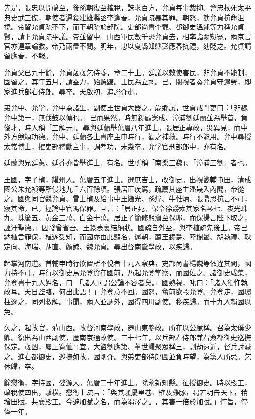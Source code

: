 \begin{pinyinscope}
先是，張忠以開礦至，後孫朝復至榷稅，誅求百方，允貞每事裁抑。會忠杖死太平典史武三傑，朝使者逼殺建雄縣丞李逢春，允貞疏暴其罪。朝怒，劾允貞抗命沮撓。帝留允貞疏不下，而下朝疏於部院。吏部尚書李戴、都御史溫純等力稱允貞賢，請下允貞疏平議。帝並留中。山西軍民數千恐允貞去，相率詣闕愬冤，兩京言官亦連章論救。帝乃兩置不問。明年，忠以夏縣知縣彭應春抗禮，劾貶之。允貞請留應春，不報。

允貞父已九十餘，允貞歲歲乞侍養，章二十上。廷議以敕使害民，非允貞不能制，固留之。其年五月，請益力，始聽歸。士民為立祠。已，閱視者奏允貞守邊勞，即家進兵部右侍郎。尋卒。天啟初，追謚介肅。

弟允中、允孚。允中為諸生，副使王世貞大器之。歲鄉試，世貞戒門吏曰：「非魏允中第一，無伐鼓以傳也。」已而果然。時無錫顧憲成、漳浦劉廷蘭並為舉首，負俊才，時人稱「三解元」。尋與廷蘭舉萬曆八年進士。張居正專政，災異見，而中外方競頌功德。允中、廷蘭各上書座主申時行，勸之補救。時行不能用。允中尋授太常博士，擢吏部稽勳主事，調考功，未幾卒。允孚官刑部郎中，亦有名。

廷蘭與兄廷蕙、廷芥亦皆舉進士，有名。世所稱「南樂三魏」、「漳浦三劉」者也。

王國，字子楨，耀州人。萬曆五年進士。選庶吉士，改御史。出視畿輔屯田，清成國公朱允禎等所侵地九千六百餘頃。張居正疾篤，疏薦其座主潘晟入內閣，帝從之。國與同官魏允貞、雷士楨及給事中王繼光、孫煒、牛惟炳、張鼎思抗言不可，寢其命。已，極論中官馮保罪。且言：「居正死，保令徐爵索其家名琴七、夜光珠九、珠簾五、黃金三萬、白金十萬。居正子簡修躬齎至保邸，而保揚言陛下取之，誣汙聖德。」因發曾省吾、王篆表裏結納狀。國疏自外至，與李植疏先後上。帝已納植言罪保，植遂受知，而國亦由此顯名。還朝，薦王錫爵、陸樹聲、胡執禮、耿定向、海瑞、胡直、顏鯨、魏允貞。尋出督南畿學政，以疾歸。

起掌河南道。首輔申時行欲置所不悅者十九人察典，吏部尚書楊巍等依違其間，國力持不可。時行以御史馬允登資在國前，乃起允登掌察，而國佐之。諸御史咸集，允登書十九人姓名，曰：「諸人可謂公論不容者矣。」國熟視，叱曰：「諸人獨忤執政耳。天日監臨，何出此語！」允登意不回。國怒，奮前欲毆允登。允登走，國環柱逐之，同列救解。事聞，兩人並調外，國得四川副使。移疾歸。而十九人賴國以免。

久之，起故官，蒞山西。改督河南學政，遷山東參政。所在以公廉稱。召為太僕少卿。復出為山西副使，歷南京通政使。三十七年，以兵部右侍郎兼右僉都御史巡撫保定。歲凶，屢上寬恤事宜。大盜劉應第、董世耀聚眾稱王，剽劫遠近，督兵討滅之。進右都御史，巡撫如故。國剛介。與弟吏部侍郎圖並負時望，為黨人所忌。乞休歸，卒。

餘懋衡，字持國，婺源人。萬曆二十年進士。除永新知縣。征授御史。時以殿工，礦稅使四出，驕橫。懋衡上疏言：「與其騷擾里巷，榷及雞豚，曷若明告天下，稍增田賦，共襄殿工。今避加賦之名，而為竭澤之計，其害十倍於加賦。」忤旨，停俸一年。


\end{pinyinscope}

